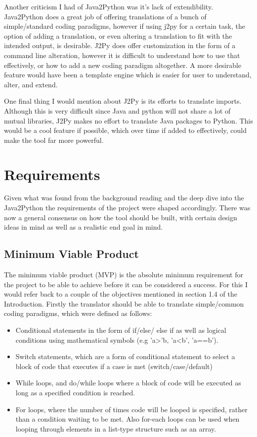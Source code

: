 \documentclass{l4proj}
\begin{document}
Another criticism I had of Java2Python was it's lack of extendibility. Java2Python does a great job of offering translations of a bunch of simple/standard coding paradigms, however if using j2py for a certain task, the option of adding a translation, or even altering a translation to fit with the intended output, is desirable. J2Py does offer customization in the form of a command line alteration, however it is difficult to understand how to use that effectively, or how to add a new coding paradigm altogether. A more desirable feature would have been a template engine which is easier for user to understand, alter, and extend.

One final thing I would mention about J2Py is its efforts to translate imports. Although this is very difficult since Java and python will not share a lot of mutual libraries, J2Py makes no effort to translate Java packages to Python. This would be a cool feature if possible, which over time if added to effectively, could make the tool far more powerful.

\section{Requirements}
Given what was found from the background reading and the deep dive into the Java2Python the requirements of the project were shaped accordingly. There was now a general consensus on how the tool should be built, with certain design ideas in mind as well as a realistic end goal in mind.

\subsection{Minimum Viable Product}
The minimum viable product (MVP) is the absolute minimum requirement for the project to be able to achieve before it can be considered a success. For this I would refer back to a couple of the objectives mentioned in section 1.4 of the Introduction. Firstly the translator should be able to translate simple/common coding paradigms, which were defined as follows:
\begin{itemize}
    \item
    Conditional statements in the form of if/else/ else if as well as logical conditions using mathematical symbols (e.g 'a>'b, 'a<b', 'a==b').
    \item
    Switch statements, which are a form of conditional statement to select a block of code that executes if a case is met (switch/case/default)
    \item
    While loops, and do/while loops where a block of code will be executed as long as a specified condition is reached.
    \item
    For loops, where the number of times code will be looped is specified, rather than a condition waiting to be met. Also for-each loops can be used when looping through elements in a list-type structure such as an array.
\end{itemize}
\end{document}
